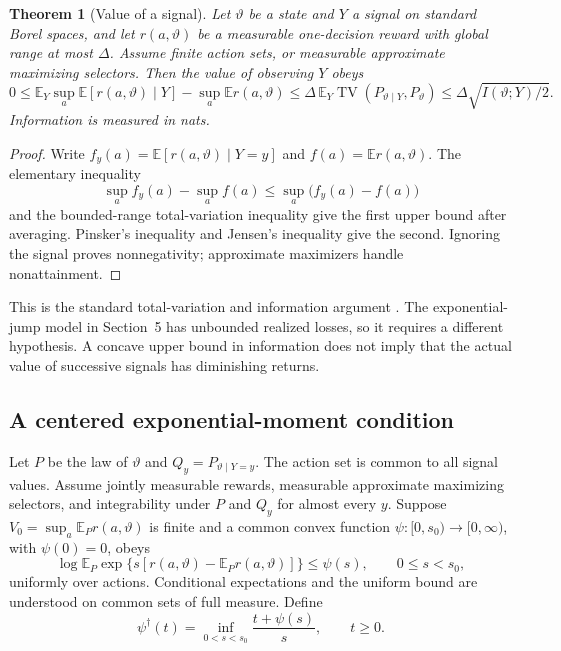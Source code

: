 \documentclass[11pt]{article}
\theoremstyle{plain}
\newtheorem{theorem}{Theorem}[section]
\theoremstyle{definition}
\theoremstyle{remark}
\newcommand{\E}{\mathbb E}
\DeclareMathOperator{\TV}{TV}
\begin{document}
\begin{theorem}[Value of a signal]\label{thm:information}
Let \(\vartheta\) be a state and \(Y\) a signal on standard Borel spaces,
and let \(r(a,\vartheta)\) be a
measurable one-decision reward with global range at most \(\Delta\).
Assume finite action sets, or measurable approximate maximizing
selectors. Then the value of observing \(Y\) obeys
\[
0\le
\E_Y\sup_a\E[r(a,\vartheta)\mid Y]
 -\sup_a\E r(a,\vartheta)
\le\Delta\,\E_Y\TV(P_{\vartheta\mid Y},P_\vartheta)
\le\Delta\sqrt{I(\vartheta;Y)/2}.
\]
Information is measured in nats.
\end{theorem}
\begin{proof}
Write \(f_y(a)=\E[r(a,\vartheta)\mid Y=y]\) and
\(f(a)=\E r(a,\vartheta)\). The elementary inequality
\[
\sup_a f_y(a)-\sup_a f(a)\le\sup_a\big(f_y(a)-f(a)\big)
\]
and the bounded-range total-variation inequality give the first upper
bound after averaging. Pinsker's inequality and Jensen's inequality
give the second. Ignoring the signal proves nonnegativity; approximate
maximizers handle nonattainment.
\end{proof}

This is the standard total-variation and information argument
\citep{CoverThomas2006}. The exponential-jump model in Section~5 has
unbounded realized losses, so it requires a different hypothesis.
A concave upper bound in information does not imply that the actual
value of successive signals has diminishing returns.

\subsection{A centered exponential-moment condition}

Let \(P\) be the law of \(\vartheta\) and \(Q_y=P_{\vartheta\mid Y=y}\).
The action set is common to all signal values. Assume jointly measurable
rewards, measurable approximate maximizing selectors, and integrability
under \(P\) and \(Q_y\) for almost every \(y\). Suppose
\(V_0=\sup_a\E_P r(a,\vartheta)\) is finite and a common convex
function \(\psi:[0,s_0)\to[0,\infty)\), with \(\psi(0)=0\), obeys
\begin{equation}\label{eq:centeredmgf}
\log\E_P\exp\{s[r(a,\vartheta)-\E_P r(a,\vartheta)]\}
\le\psi(s),\qquad 0\le s<s_0,
\end{equation}
uniformly over actions. Conditional expectations and the uniform bound
are understood on common sets of full measure. Define
\[
\psi^\dagger(t)=\inf_{0<s<s_0}\frac{t+\psi(s)}s,\qquad t\ge0.
\]
\end{document}
